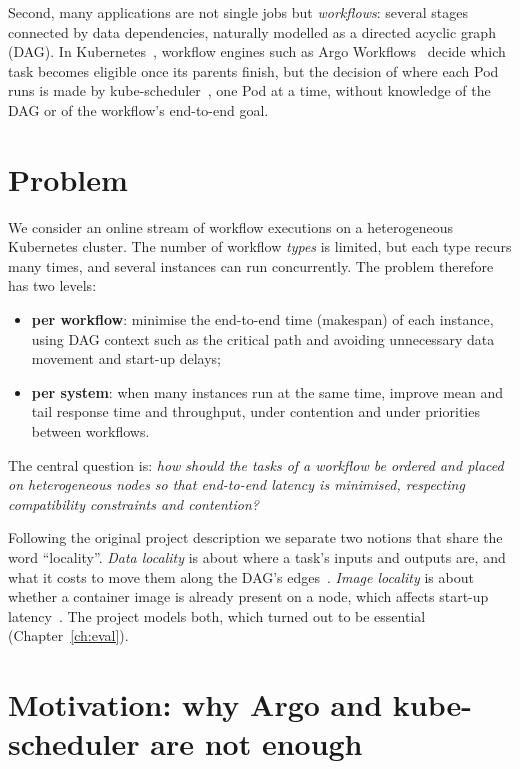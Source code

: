 \documentclass[12pt,a4paper]{report}
\begin{document}
Second, many applications are not single jobs but \emph{workflows}:
several stages connected by data dependencies, naturally modelled as a
directed acyclic graph (DAG). In Kubernetes~\cite{kubernetes}, workflow
engines such as Argo Workflows~\cite{argo-workflows,argo-dag} decide which
task becomes eligible once its parents finish, but the decision of where
each Pod runs is made by kube-scheduler~\cite{kubernetes-scheduler,
kubernetes-framework}, one Pod at a time, without knowledge of the DAG or
of the workflow's end-to-end goal.

\section{Problem}

We consider an online stream of workflow executions on a heterogeneous
Kubernetes cluster. The number of workflow \emph{types} is limited, but
each type recurs many times, and several instances can run concurrently.
The problem therefore has two levels:

\begin{itemize}
\item \textbf{per workflow}: minimise the end-to-end time (makespan) of each
      instance, using DAG context such as the critical path and avoiding
      unnecessary data movement and start-up delays;
\item \textbf{per system}: when many instances run at the same time,
      improve mean and tail response time and throughput, under contention
      and under priorities between workflows.
\end{itemize}

The central question is: \emph{how should the tasks of a workflow be
ordered and placed on heterogeneous nodes so that end-to-end latency is
minimised, respecting compatibility constraints and contention?}

Following the original project description we separate two notions that
share the word ``locality''. \emph{Data locality} is about where a task's
inputs and outputs are, and what it costs to move them along the DAG's
edges~\cite{zaharia2010delay,isard2009quincy}. \emph{Image locality} is
about whether a container image is already present on a node, which
affects start-up latency~\cite{kubernetes-config}. The project models
both, which turned out to be essential (Chapter~\ref{ch:eval}).

\section{Motivation: why Argo and kube-scheduler are not enough}
\end{document}
